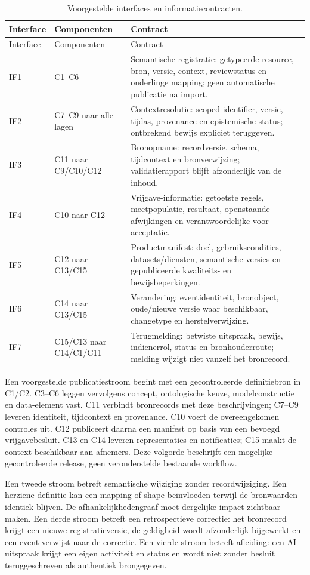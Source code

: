 \begin{longtable}{@{}P{.10\linewidth}P{.25\linewidth}P{.56\linewidth}@{}}
\caption{Voorgestelde interfaces en informatiecontracten.}\label{tab:interfaces}\\
\toprule Interface & Componenten & Contract \\ \midrule\endfirsthead
\toprule Interface & Componenten & Contract \\ \midrule\endhead
IF1 & C1--C6 & Semantische registratie: getypeerde resource, bron, versie, context, reviewstatus en onderlinge mapping; geen automatische publicatie na import. \\
IF2 & C7--C9 naar alle lagen & Contextresolutie: scoped identifier, versie, tijdas, provenance en epistemische status; ontbrekend bewijs expliciet teruggeven. \\
IF3 & C11 naar C9/C10/C12 & Bronopname: recordversie, schema, tijdcontext en bronverwijzing; validatierapport blijft afzonderlijk van de inhoud. \\
IF4 & C10 naar C12 & Vrijgave-informatie: getoetste regels, meetpopulatie, resultaat, openstaande afwijkingen en verantwoordelijke voor acceptatie. \\
IF5 & C12 naar C13/C15 & Productmanifest: doel, gebruikscondities, datasets/diensten, semantische versies en gepubliceerde kwaliteits- en bewijsbeperkingen. \\
IF6 & C14 naar C13/C15 & Verandering: eventidentiteit, bronobject, oude/nieuwe versie waar beschikbaar, changetype en herstelverwijzing. \\
IF7 & C15/C13 naar C14/C1/C11 & Terugmelding: betwiste uitspraak, bewijs, indienerrol, status en bronhouderroute; melding wijzigt niet vanzelf het bronrecord. \\
\bottomrule
\end{longtable}

Een voorgestelde publicatiestroom begint met een gecontroleerde definitiebron in C1/C2. C3--C6 leggen vervolgens concept, ontologische keuze, modelconstructie en data-element vast. C11 verbindt bronrecords met deze beschrijvingen; C7--C9 leveren identiteit, tijdcontext en provenance. C10 voert de overeengekomen controles uit. C12 publiceert daarna een manifest op basis van een bevoegd vrijgavebesluit. C13 en C14 leveren representaties en notificaties; C15 maakt de context beschikbaar aan afnemers. Deze volgorde beschrijft een mogelijke gecontroleerde release, geen veronderstelde bestaande workflow.

Een tweede stroom betreft semantische wijziging zonder recordwijziging. Een herziene definitie kan een mapping of shape beïnvloeden terwijl de bronwaarden identiek blijven. De afhankelijkhedengraaf moet dergelijke impact zichtbaar maken. Een derde stroom betreft een retrospectieve correctie: het bronrecord krijgt een nieuwe registratieversie, de geldigheid wordt afzonderlijk bijgewerkt en een event verwijst naar de correctie. Een vierde stroom betreft afleiding: een AI-uitspraak krijgt een eigen activiteit en status en wordt niet zonder besluit teruggeschreven als authentiek brongegeven.

